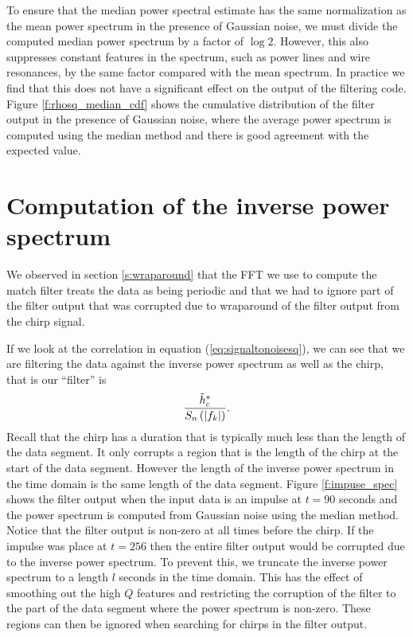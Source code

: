 To ensure that the median power spectral estimate has the same normalization
as the mean power spectrum in the presence of Gaussian noise, we must divide
the computed median power spectrum by a factor of $\log 2$. However, this also
suppresses constant features in the spectrum, such as power lines and wire
resonances, by the same factor compared with the mean spectrum. In practice we
find that this does not have a significant effect on the output of the
filtering code. Figure \ref{f:rhosq_median_cdf} shows the cumulative
distribution of the filter output in the presence of Gaussian noise, where the
average power spectrum is computed using the median method and there is good
agreement with the expected value.

\section{Computation of the inverse power spectrum}
\label{ss:invspec}

We observed in section \ref{s:wraparound} that the FFT we use to compute the
match filter treats the data as being periodic and that we had to ignore part
of the filter output that was corrupted due to wraparound of the filter output
from the chirp signal. 

If we look at the correlation in equation (\ref{eq:signaltonoisesq}), we can
see that we are filtering the data against the inverse power
spectrum as well as the chirp, that is our ``filter'' is
\begin{equation}
\frac{\tilde{h}_c^\ast}{S_n\left(\left|f_{k}\right|\right)}.
\end{equation}
Recall that the chirp has a duration that is typically much less than the
length of the data segment. It only corrupts a region that is the length of
the chirp at the start of the data segment. However the length of the 
inverse power spectrum in the time domain is the same length of the data
segment. Figure \ref{f:impuse_spec} shows the filter output when the input
data is an impulse at $t=90$ seconds and the power spectrum is computed from
Gaussian noise using the median method. Notice that the filter output is
non-zero at all times before the chirp. If the impulse was place at $t=256$
then the entire filter output would be corrupted due to the inverse power
spectrum.  To prevent this, we truncate the inverse power spectrum to a
length $l$ seconds in the time domain. This has the effect of smoothing out the
high $Q$ features and restricting the corruption of the filter to the part of
the data segment where the power spectrum is non-zero. These regions can then
be ignored when searching for chirps in the filter output.

